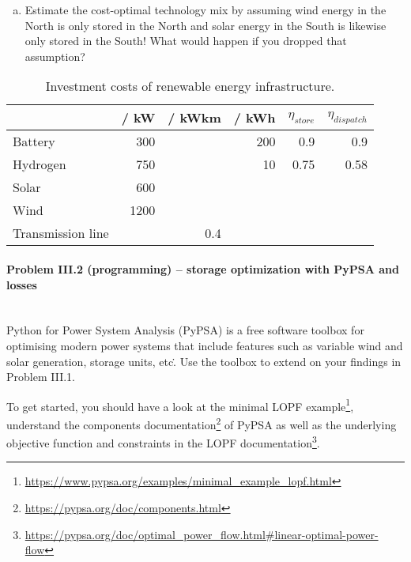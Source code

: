 \documentclass[11pt,a4paper,fleqn]{scrartcl}
\newcommand{\eur}{\text{\EUR{}}}
\begin{document}
\begin{enumerate}[(f)]
 \item  Estimate the cost-optimal technology mix by assuming wind energy in the North is only stored in the North and solar energy in the South is likewise only stored in the South! What would happen if you dropped that assumption?
\end{enumerate}

\begin{table}[h]
 \centering
 \label{tab:prices}
 \begin{tabular}{@{}lrrrrr@{}}
  \toprule
                             & \eur / kW & \eur / kWkm & \eur / kWh & $\eta_{store}$ & $\eta_{dispatch}$ \\ \midrule
  Battery                    & 300         & & 200          & 0.9            & 0.9               \\
  Hydrogen                   & 750         & & 10           & 0.75           & 0.58              \\
  Solar                      & 600         & &              &                &                   \\
  Wind                       & 1200        & &              &                &                   \\
  Transmission line &          & 0.4 &              &                &                   \\ \bottomrule
 \end{tabular}
 \caption{Investment costs of renewable energy infrastructure.}
\end{table}

\newpage
\paragraph{Problem III.2 (programming) -- storage optimization with PyPSA and losses}~\\

Python for Power System Analysis (PyPSA) is a free software toolbox for optimising modern power systems that include features such as variable wind and solar generation, storage units, etc\.. Use the toolbox to extend on your findings in Problem III.1.

To get started, you should have a look at the minimal LOPF example\footnote{\url{https://www.pypsa.org/examples/minimal_example_lopf.html}}, understand  the components documentation\footnote{\url{https://pypsa.org/doc/components.html}} of PyPSA as well as the underlying objective function and constraints in the LOPF documentation\footnote{\url{https://pypsa.org/doc/optimal_power_flow.html\#linear-optimal-power-flow}}.
\end{document}
